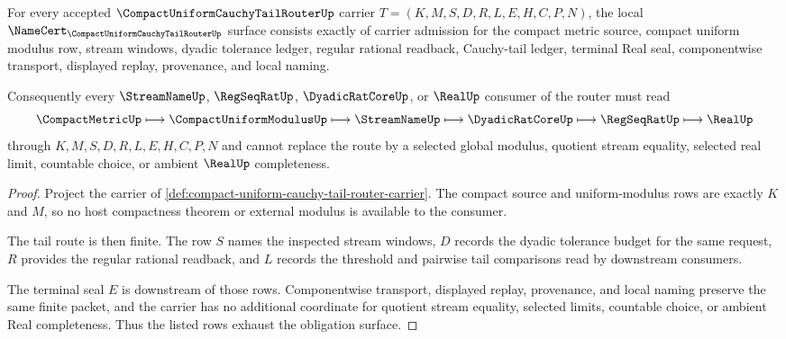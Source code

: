 \begin{theorem}
\label{thm:compact-uniform-cauchy-tail-router-obligation-surface}
For every accepted $\CompactUniformCauchyTailRouterUp$ carrier $T=(K,M,S,D,R,L,E,H,C,P,N)$, the local $\NameCert_{\CompactUniformCauchyTailRouterUp}$ surface consists exactly of carrier admission for the compact metric source, compact uniform modulus row, stream windows, dyadic tolerance ledger, regular rational readback, Cauchy-tail ledger, terminal Real seal, componentwise transport, displayed replay, provenance, and local naming.

Consequently every $\StreamNameUp$, $\RegSeqRatUp$, $\DyadicRatCoreUp$, or $\RealUp$ consumer of the router must read
$$
\CompactMetricUp \longmapsto \CompactUniformModulusUp \longmapsto \StreamNameUp \longmapsto \DyadicRatCoreUp \longmapsto \RegSeqRatUp \longmapsto \RealUp
$$
through $K,M,S,D,R,L,E,H,C,P,N$ and cannot replace the route by a selected global modulus, quotient stream equality, selected real limit, countable choice, or ambient $\RealUp$ completeness.
\end{theorem}
\begin{proof}
Project the carrier of \autoref{def:compact-uniform-cauchy-tail-router-carrier}. The compact source and uniform-modulus rows are exactly $K$ and $M$, so no host compactness theorem or external modulus is available to the consumer.

The tail route is then finite. The row $S$ names the inspected stream windows, $D$ records the dyadic tolerance budget for the same request, $R$ provides the regular rational readback, and $L$ records the threshold and pairwise tail comparisons read by downstream consumers.

The terminal seal $E$ is downstream of those rows. Componentwise transport, displayed replay, provenance, and local naming preserve the same finite packet, and the carrier has no additional coordinate for quotient stream equality, selected limits, countable choice, or ambient Real completeness. Thus the listed rows exhaust the obligation surface.
\end{proof}

